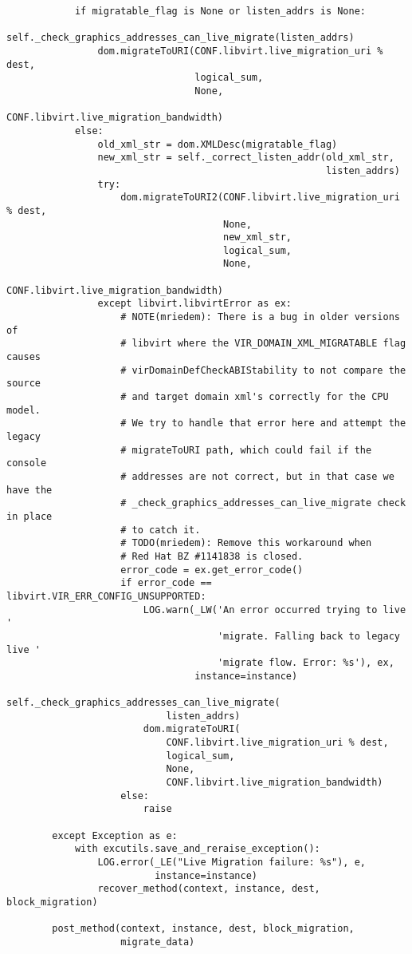 \documentclass[a4paper,left=1.5cm,right=1.5cm,11pt]{article}
\begin{document}
\begin{lstlisting}
            if migratable_flag is None or listen_addrs is None:
                self._check_graphics_addresses_can_live_migrate(listen_addrs)
                dom.migrateToURI(CONF.libvirt.live_migration_uri % dest,
                                 logical_sum,
                                 None,
                                 CONF.libvirt.live_migration_bandwidth)
            else:
                old_xml_str = dom.XMLDesc(migratable_flag)
                new_xml_str = self._correct_listen_addr(old_xml_str,
                                                        listen_addrs)
                try:
                    dom.migrateToURI2(CONF.libvirt.live_migration_uri % dest,
                                      None,
                                      new_xml_str,
                                      logical_sum,
                                      None,
                                      CONF.libvirt.live_migration_bandwidth)
                except libvirt.libvirtError as ex:
                    # NOTE(mriedem): There is a bug in older versions of
                    # libvirt where the VIR_DOMAIN_XML_MIGRATABLE flag causes
                    # virDomainDefCheckABIStability to not compare the source
                    # and target domain xml's correctly for the CPU model.
                    # We try to handle that error here and attempt the legacy
                    # migrateToURI path, which could fail if the console
                    # addresses are not correct, but in that case we have the
                    # _check_graphics_addresses_can_live_migrate check in place
                    # to catch it.
                    # TODO(mriedem): Remove this workaround when
                    # Red Hat BZ #1141838 is closed.
                    error_code = ex.get_error_code()
                    if error_code == libvirt.VIR_ERR_CONFIG_UNSUPPORTED:
                        LOG.warn(_LW('An error occurred trying to live '
                                     'migrate. Falling back to legacy live '
                                     'migrate flow. Error: %s'), ex,
                                 instance=instance)
                        self._check_graphics_addresses_can_live_migrate(
                            listen_addrs)
                        dom.migrateToURI(
                            CONF.libvirt.live_migration_uri % dest,
                            logical_sum,
                            None,
                            CONF.libvirt.live_migration_bandwidth)
                    else:
                        raise

        except Exception as e:
            with excutils.save_and_reraise_exception():
                LOG.error(_LE("Live Migration failure: %s"), e,
                          instance=instance)
                recover_method(context, instance, dest, block_migration)

        post_method(context, instance, dest, block_migration,
                    migrate_data)
    \end{lstlisting}
\end{document}
